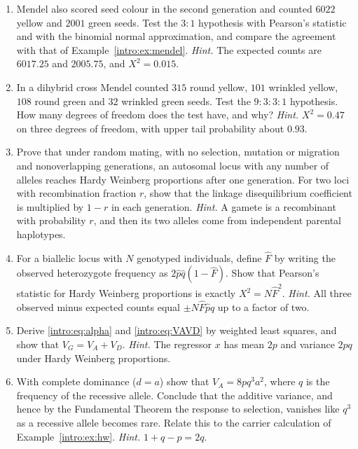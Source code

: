 \begin{enumerate}[label=\arabic*.,ref=\arabic*,leftmargin=*]

\item Mendel also scored seed colour in the second generation and counted $6022$ yellow and
$2001$ green seeds. Test the $3:1$ hypothesis with Pearson's statistic and with the binomial
normal approximation, and compare the agreement with that of Example~\ref{intro:ex:mendel}.
\emph{Hint.} The expected counts are $6017.25$ and $2005.75$, and $X^2=0.015$.

\item In a dihybrid cross Mendel counted $315$ round yellow, $101$ wrinkled yellow, $108$ round
green and $32$ wrinkled green seeds. Test the $9:3:3:1$ hypothesis. How many degrees of freedom
does the test have, and why? \emph{Hint.} $X^2=0.47$ on three degrees of freedom, with upper tail
probability about $0.93$.

\item Prove that under random mating, with no selection, mutation or migration and
nonoverlapping generations, an autosomal locus with any number of alleles reaches Hardy Weinberg
proportions after one generation. For two loci with recombination fraction $r$, show that the
linkage disequilibrium coefficient is multiplied by $1-r$ in each generation. \emph{Hint.} A
gamete is a recombinant with probability $r$, and then its two alleles come from independent
parental haplotypes.

\item\label{intro:exr:F} For a biallelic locus with $N$ genotyped individuals, define $\hat F$
by writing the observed heterozygote frequency as $2\hat p\hat q(1-\hat F)$. Show that Pearson's
statistic for Hardy Weinberg proportions is exactly $X^2=N\hat F^2$. \emph{Hint.} All three
observed minus expected counts equal $\pm N\hat F\hat p\hat q$ up to a factor of two.

\item Derive \eqref{intro:eq:alpha} and \eqref{intro:eq:VAVD} by weighted least squares, and show
that $V_G=V_A+V_D$. \emph{Hint.} The regressor $x$ has mean $2p$ and variance $2pq$ under Hardy
Weinberg proportions.

\item With complete dominance ($d=a$) show that $V_A=8pq^3a^2$, where $q$ is the frequency of the
recessive allele. Conclude that the additive variance, and hence by the Fundamental Theorem the
response to selection, vanishes like $q^3$ as a recessive allele becomes rare. Relate this to the
carrier calculation of Example~\ref{intro:ex:hw}. \emph{Hint.} $1+q-p=2q$.


\end{enumerate}
